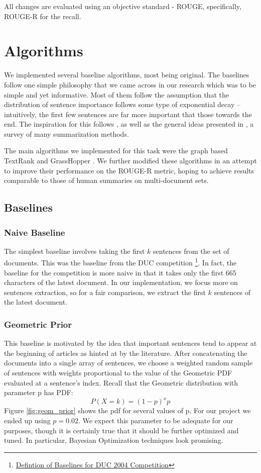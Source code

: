 \documentclass[10pt]{article}
\begin{document}
All changes are evaluated using an objective standard - ROUGE, specifically, ROUGE-R for the recall.

\section{Algorithms}
We implemented several baseline algorithms, most being original. The baselines follow one simple philosophy that we came across in our research which was to be simple and yet informative. Most of them follow the assumption that the distribution of sentence importance follows some type of exponential decay -- intuitively, the first few sentences are far more important that those towards the end. The inspiration for this follows \cite{hmm_summary}, as well as the general ideas presented in \cite{survey}, a survey of many summarization methods.

The main algorithms we implemented for this task were the graph based TextRank \cite{textrank} and GrassHopper \cite{grasshopper}. We further modified these algorithms in an attempt to improve their performance on the ROUGE-R metric, hoping to achieve results comparable to those of human summaries on multi-document sets.

\subsection{Baselines}
\subsubsection{Naive Baseline}
The simplest baseline involves taking the first $k$ sentences from the set of documents. This was the baseline from the DUC competition \footnote{\href{http://duc.nist.gov/duc2004/baseline_definitions}{Defintion of Baselines for DUC 2004 Competition}}. In fact, the baseline for the competition is more naive in that it takes only the first 665 characters of the latest document. In our implementation, we focus more on sentences extraction, so for a fair comparison, we extract the first $k$ sentences of the latest document.

\subsubsection{Geometric Prior}
This baseline is motivated by the idea that important sentences tend to appear at the beginning of articles as hinted at by the literature. After concatenating the documents into a single array of sentences, we choose a weighted random sample of sentences with weights proportional to the value of the Geometric PDF evaluated at a sentence's index. Recall that the Geometric distribution with parameter p has PDF:
$$ P(X = k) = (1- p)^x p$$
Figure \ref{fig:geom_prior} shows the pdf for several values of p. For our project we ended up using $p = 0.02$. We expect this parameter to be adequate for our purposes, though it is certainly true that it should be further optimized and tuned. In particular, Bayesian Optimization techniques look promising.
\end{document}
